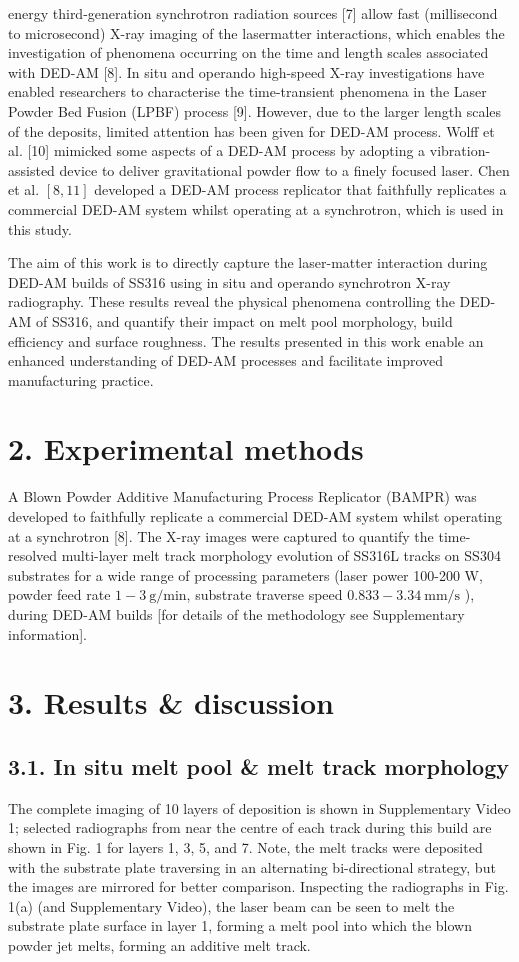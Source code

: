 \documentclass[10pt]{article}
\begin{document}
energy third-generation synchrotron radiation sources [7] allow fast (millisecond to microsecond) X-ray imaging of the lasermatter interactions, which enables the investigation of phenomena occurring on the time and length scales associated with DED-AM [8]. In situ and operando high-speed X-ray investigations have enabled researchers to characterise the time-transient phenomena in the Laser Powder Bed Fusion (LPBF) process [9]. However, due to the larger length scales of the deposits, limited attention has been given for DED-AM process. Wolff et al. [10] mimicked some aspects of a DED-AM process by adopting a vibration-assisted device to deliver gravitational powder flow to a finely focused laser. Chen et al. $[8,11]$ developed a DED-AM process replicator that faithfully replicates a commercial DED-AM system whilst operating at a synchrotron, which is used in this study.

The aim of this work is to directly capture the laser-matter interaction during DED-AM builds of SS316 using in situ and operando synchrotron X-ray radiography. These results reveal the physical phenomena controlling the DED-AM of SS316, and quantify their impact on melt pool morphology, build efficiency and surface roughness. The results presented in this work enable an enhanced understanding of DED-AM processes and facilitate improved manufacturing practice.

\section*{2. Experimental methods}
A Blown Powder Additive Manufacturing Process Replicator (BAMPR) was developed to faithfully replicate a commercial DED-AM system whilst operating at a synchrotron [8]. The X-ray images were captured to quantify the time-resolved multi-layer melt track morphology evolution of SS316L tracks on SS304 substrates for a wide range of processing parameters (laser power 100-200 W, powder feed rate $1-3 \mathrm{~g} / \mathrm{min}$, substrate traverse speed $0.833-3.34 \mathrm{~mm} / \mathrm{s}$ ), during DED-AM builds [for details of the methodology see Supplementary information].

\section*{3. Results \& discussion}
\subsection*{3.1. In situ melt pool \& melt track morphology}
The complete imaging of 10 layers of deposition is shown in Supplementary Video 1; selected radiographs from near the centre of each track during this build are shown in Fig. 1 for layers 1, 3, 5, and 7. Note, the melt tracks were deposited with the substrate plate traversing in an alternating bi-directional strategy, but the images are mirrored for better comparison. Inspecting the radiographs in Fig. 1(a) (and Supplementary Video), the laser beam can be seen to melt the substrate plate surface in layer 1, forming a melt pool into which the blown powder jet melts, forming an additive melt track.
\end{document}
